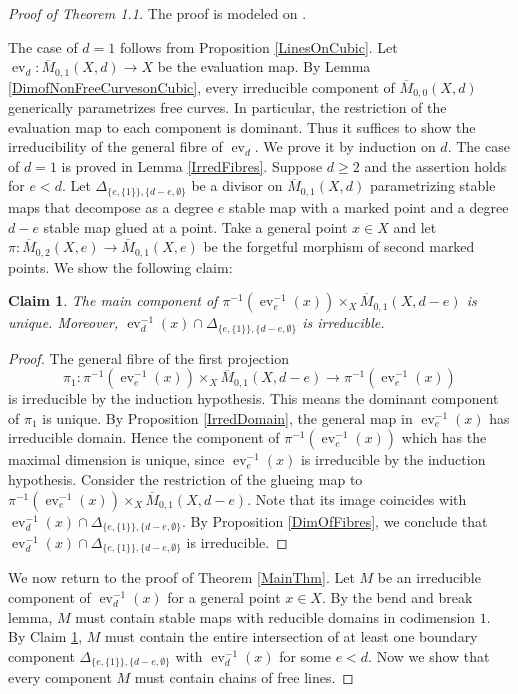 \documentclass[dvipdfmx, 12pt, a4paper]{amsart}
\theoremstyle{plain}
\newtheorem{claim}[thm]{Claim}
\theoremstyle{definition}
\theoremstyle{remark}
\newcommand{\ra}{\rightarrow}
\DeclareMathOperator{\ev}{ev}
\newcommand{\ol}{\overline}
\begin{document}
	\begin{proof}[Proof of Theorem 1.1]
		The proof is modeled on \cite[Proof of Theorem 1.1]{CoskunStarr2009}.
		
		The case of $d=1$ follows from Proposition \ref{LinesOnCubic}. Let $\ev_d:\ol{M}_{0,1}(X,d)\ra X$ be the evaluation map. By Lemma \ref{DimofNonFreeCurvesonCubic}, every irreducible component of $\ol{M}_{0,0}(X,d)$ generically parametrizes free curves. In particular, the restriction of the evaluation map to each component is dominant. Thus it suffices to show the irreducibility of the general fibre of $\ev_d$. We prove it by induction on $d$. The case of $d=1$ is proved in Lemma \ref{IrredFibres}. Suppose $d\geq2$ and the assertion holds for $e<d$. Let $\Delta_{\{e,\{1\}\},\{d-e,\emptyset\}}$ be a divisor on $\ol{M}_{0,1}(X,d)$ parametrizing stable maps that decompose as a degree $e$ stable map with a marked point and a degree $d-e$ stable map glued at a point. Take a general point $x\in X$ and let $\pi:\ol{M}_{0,2}(X,e)\ra\ol{M}_{0,1}(X,e)$ be the forgetful morphism of second marked points. We show the following claim:
		\begin{claim}\label{claim1}
			The main component of $\pi^{-1}(\ev_e^{-1}(x))\times_X\ol{M}_{0,1}(X,d-e)$ is unique. Moreover, $\ev_d^{-1}(x)\cap\Delta_{\{e,\{1\}\},\{d-e,\emptyset\}}$ is irreducible.
		\end{claim}
			\begin{proof}
				The general fibre of the first projection
				$$\pi_1:\pi^{-1}(\ev_e^{-1}(x))\times_X\ol{M}_{0,1}(X,d-e)\ra\pi^{-1}(\ev_e^{-1}(x))$$
				is irreducible by the induction hypothesis. This means the dominant component of $\pi_1$ is unique.
				By Proposition \ref{IrredDomain}, the general map in $\ev_e^{-1}(x)$ has irreducible domain. Hence the component of $\pi^{-1}(\ev_e^{-1}(x))$ which has the maximal dimension is unique, since $\ev_e^{-1}(x)$ is irreducible by the induction hypothesis. Consider the restriction of the glueing map to $\pi^{-1}(\ev_e^{-1}(x))\times_X\ol{M}_{0,1}(X,d-e)$. Note that its image coincides with $\ev_d^{-1}(x)\cap\Delta_{\{e,\{1\}\},\{d-e,\emptyset\}}$. By Proposition \ref{DimOfFibres}, we conclude that $\ev_d^{-1}(x)\cap\Delta_{\{e,\{1\}\},\{d-e,\emptyset\}}$ is irreducible.
			\end{proof}
		We now return to the proof of Theorem \ref{MainThm}. Let $M$ be an irreducible component of $\ev_d^{-1}(x)$ for a general point $x\in X$. By the bend and break lemma, $M$ must contain stable maps with reducible domains in codimension $1$. By Claim \ref{claim1}, $M$ must contain the entire intersection of at least one boundary component $	\Delta_{\{e,\{1\}\},\{d-e,\emptyset\}}$ with $\ev_d^{-1}(x)$ for some $e<d$. Now we show that every component $M$ must contain chains of free lines.
		

\end{proof}
\end{document}
